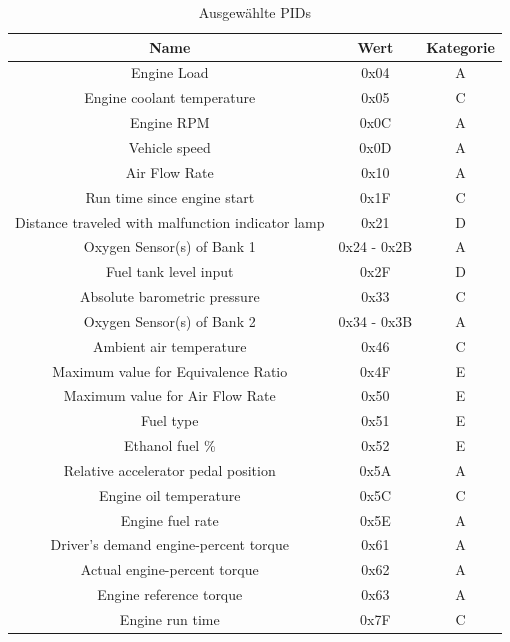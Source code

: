 		\begin{table}[htp!]
			\caption{Ausgewählte \acp{PID}}
			\label{selectedPIDs}
		
			\begin{center}
				\begin{tabular}{|c|c|c|}
					\hline 
					Name & Wert & Kategorie \\ 
					\hline
					Engine Load & 0x04 & A \\ 
					\hline
					Engine coolant temperature & 0x05 & C \\ 
					\hline 
					Engine RPM & 0x0C & A \\ 
					\hline 
					Vehicle speed & 0x0D & A \\ 
					\hline
					Air Flow Rate & 0x10 & A\\
					\hline 
					Run time since engine start & 0x1F & C \\ 
					\hline 
					Distance traveled with malfunction indicator lamp & 0x21 & D \\ 
					\hline
					Oxygen Sensor(s) of Bank 1 & 0x24 - 0x2B & A \\
					\hline 
					Fuel tank level input & 0x2F & D \\ 
					\hline 
					Absolute barometric pressure & 0x33 & C \\ 
					\hline
					Oxygen Sensor(s) of Bank 2 & 0x34 - 0x3B & A \\ 
					\hline
					Ambient air temperature & 0x46 & C \\ 
					\hline
					Maximum value for Equivalence Ratio & 0x4F & E \\
					\hline
					Maximum value for Air Flow Rate & 0x50 & E \\
					\hline 
					Fuel type & 0x51 & E \\ 
					\hline 
					Ethanol fuel \% & 0x52 & E \\ 
					\hline 
					Relative accelerator pedal position & 0x5A & A \\ 
					\hline 
					Engine oil temperature & 0x5C & C \\ 
					\hline 
					Engine fuel rate & 0x5E & A \\ 
					\hline 
					Driver's demand engine-percent torque & 0x61 & A \\ 
					\hline 
					Actual engine-percent torque & 0x62 & A \\ 
					\hline 
					Engine reference torque & 0x63 & A \\ 
					\hline 
					Engine run time & 0x7F & C \\ 
					\hline 
				\end{tabular} 
			\end{center}
		\end{table}
		

